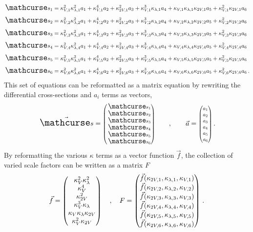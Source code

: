     \begin{equation} \label{eq:allsixxsecs} \begin{split}
        \crossterm{1} \\
        \crossterm{2} \\
        \crossterm{3} \\
        \crossterm{4} \\
        \crossterm{5} \\
        \crossterm{6} \,. \\
    \end{split} \end{equation}
    This set of equations can be reformatted as a matrix equation
        by rewriting the differential cross-sections and $a_i$ terms as vectors,
    \begin{equation}
        \vec{\xsec} = \minimatrix{ \xsec_{1} \\ \xsec_{2} \\ \xsec_{3} \\ \xsec_{4} \\ \xsec_{5} \\ \xsec_{6} }
        \qquad,\qquad
        \vec{a} = \minimatrix{ a_1 \\ a_2 \\ a_3 \\ a_4 \\ a_5 \\ a_6 }
        \,.
    \end{equation}
    By reformatting the various $\kappa$ terms as a vector function $\vec{f}$,
        the collection of varied scale factors can be written as a matrix $F$
    \begin{equation}
        \vec{f} = \begin{pmatrix} \kappa_{V}^2 \kappa_{\lambda}^2 \\ \kappa_{V}^4 \\ \kappa_{2V}^2 \\ \kappa_{V}^3 \kappa_{\lambda} \\ \kappa_{V} \kappa_{\lambda} \kappa_{2V} \\ \kappa_{V}^2 \kappa_{2V} \end{pmatrix}
        \quad,\quad
        F = \begin{pmatrix}
            \vec{f}(\kappa_{2V,1}, \kappa_{\lambda,1}, \kappa_{V,1}) \\
            \vec{f}(\kappa_{2V,2}, \kappa_{\lambda,2}, \kappa_{V,2}) \\
            \vec{f}(\kappa_{2V,3}, \kappa_{\lambda,3}, \kappa_{V,3}) \\
            \vec{f}(\kappa_{2V,4}, \kappa_{\lambda,4}, \kappa_{V,4}) \\
            \vec{f}(\kappa_{2V,5}, \kappa_{\lambda,5}, \kappa_{V,5}) \\
            \vec{f}(\kappa_{2V,6}, \kappa_{\lambda,6}, \kappa_{V,6}) \\
        \end{pmatrix}
        \,.
    \end{equation}
